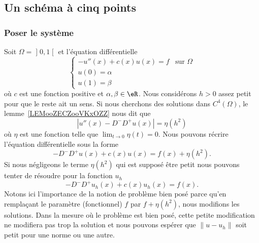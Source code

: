 \subsection{Un schéma à cinq points}

\subsubsection{Poser le système}

Soit \( \Omega=\mathopen] 0 , 1 \mathclose[\) et l'équation différentielle
\begin{equation}        \label{EQooXJBWooRhCsLy}
	\begin{cases}
		-u''(x)+c(x)u(x)=f & \text{sur } \Omega \\
		u(0)=\alpha                             \\
		u(1)=\beta
	\end{cases}
\end{equation}
où \( c\) est une fonction positive et \( \alpha,\beta\in \eR\). Nous considérons \( h>0\) assez petit pour que le reste ait un sens. Si nous cherchons des solutions dans \( C^4(\Omega)\), le lemme~\ref{LEMooZECZooVKxOZZ} nous dit que
\begin{equation}
	| u''(x)-D^-D^+u(x) |=\eta(h^2)
\end{equation}
où \( \eta\) est une fonction telle que \( \lim_{t\to 0} \eta(t)=0\). Nous pouvons récrire l'équation différentielle sous la forme
\begin{equation}
	-D^-D^+u(x)+c(x)u(x)=f(x)+\eta(h^2).
\end{equation}
Si nous négligeons le terme \( \eta(h^2)\) qui est supposé être petit nous pouvons tenter de résoudre pour la fonction \( u_h\)
\begin{equation}
	-D^-D^+u_h(x)+c(x)u_h(x)=f(x).
\end{equation}
Notons ici l'importance de la notion de problème bien posé parce qu'en remplaçant le paramètre (fonctionnel) \( f\) par \( f+\eta(h^2)\), nous modifions les solutions. Dans la mesure où le problème est bien posé, cette petite modification ne modifiera pas trop la solution et nous pouvons espérer que \( \| u-u_h \|\) soit petit pour une norme ou une autre.

